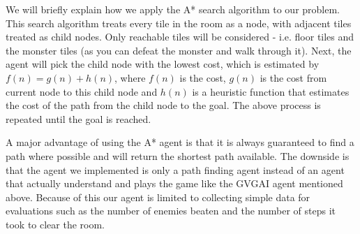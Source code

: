 \documentclass{article}
\begin{document}
We will briefly explain how we apply the A* search algorithm to our problem. This search algorithm treats every tile in the room as a node, with adjacent tiles treated as child nodes. Only reachable tiles will be considered - i.e. floor tiles and the monster tiles (as you can defeat the monster and walk through it). Next, the agent will pick the child node with the lowest cost, which is estimated by $f(n) = g(n) + h(n)$, where $f(n)$ is the cost, $g(n)$ is the cost from current node to this child node and $h(n)$ is a heuristic function that estimates the cost of the path from the child node to the goal. The above process is repeated until the goal is reached. 

A major advantage of using the A* agent is that it is always guaranteed to find a path where possible and will return the shortest path available. The downside is that the agent we implemented is only a path finding agent instead of an agent that actually understand and plays the game like the GVGAI agent mentioned above. Because of this our agent is limited to collecting simple data for evaluations such as the number of enemies beaten and the number of steps it took to clear the room. 

\end{document}

